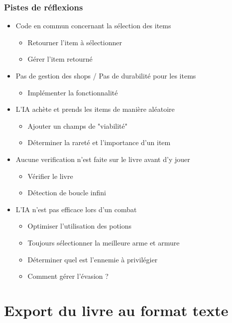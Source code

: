 \documentclass[beamer]{BetterDocument}
\begin{document}
	\begin{frame}
		\frametitle{Pistes de réflexions}

		\begin{itemize}
			\item{Code en commun concernant la sélection des items}
			\begin{itemize}
				\item{Retourner l'item à sélectionner}
				\item{Gérer l'item retourné}
			\end{itemize}

			\item{Pas de gestion des shops / Pas de durabilité pour les items}
			\begin{itemize}
				\item{Implémenter la fonctionnalité}
			\end{itemize}

			\item{L'IA achète et prends les items de manière aléatoire}
			\begin{itemize}
				\item{Ajouter un champs de "viabilité"}
				\item{Déterminer la rareté et l'importance d'un item}
			\end{itemize}

			\item{Aucune verification n'est faite sur le livre avant d'y jouer}
			\begin{itemize}
				\item{Vérifier le livre}
				\item{Détection de boucle infini}
			\end{itemize}

			\item{L'IA n'est pas efficace lors d'un combat}
			\begin{itemize}
				\item{Optimiser l'utilisation des potions}
				\item{Toujours sélectionner la meilleure arme et armure}
				\item{Déterminer quel est l'ennemie à privilégier}
				\item{Comment gérer l'évasion ?}
			\end{itemize}
		\end{itemize}
	\end{frame}

	\section{Export du livre au format texte}
\end{document}
